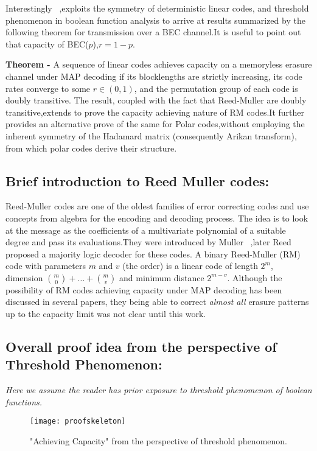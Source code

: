 \documentclass[
10pt, %
a4paper, %
oneside, %
headinclude,footinclude, %
BCOR5mm, %
]{scrartcl}
\begin{document}
Interestingly ~\cite{rm2},exploits the symmetry of deterministic linear codes, and threshold phenomenon in boolean function analysis to arrive at results summarized by the following theorem for transmission over a BEC channel.It is useful to point out that capacity of BEC($p$),$r=1-p$.

\textbf{Theorem - } A sequence of linear codes achieves capacity on
a memoryless erasure channel under MAP decoding if its blocklengths are strictly increasing, its code rates converge to some $r \in (0, 1)$, and the permutation group of each code is doubly transitive. 
The result, coupled with the fact that Reed-Muller are doubly transitive,extends to prove the capacity achieving nature of RM codes.It further provides an alternative prove of the same for Polar codes,without employing the inherent symmetry of the Hadamard matrix (consequently Arikan transform), from which polar codes derive their structure.

\subsection*{Brief introduction to Reed Muller codes:}
Reed-Muller codes are one of the oldest families of error correcting codes and use
concepts from algebra for the encoding and decoding process. The idea is to look
at the message as the coefficients of a multivariate polynomial of a suitable degree and pass 
its evaluations.They were introduced by Muller~\cite{muller} ,later Reed~\cite{reed} proposed a majority logic decoder for these codes. A binary Reed-Muller (RM) code with parameters $m$ and $v$ (the order) is a linear code of length $2^m$, dimension ${m \choose 0}+\ldots+{m \choose v}$ and minimum distance $2^{m-v}$. Although the possibility of RM codes achieving capacity under MAP decoding has been discussed in several papers, they being able to correct \emph{almost all} erasure patterns up to the capacity limit was not clear until this work.

\subsection*{Overall proof idea from the perspective of Threshold Phenomenon:}
\emph{Here we assume the reader has prior exposure to threshold phenomenon of boolean functions.}
\begin{figure}[h]
\centering 
\texttt{[image: proofskeleton]} 
\caption[]{"Achieving Capacity" from the perspective of threshold phenomenon. } %
\label{fig:proofskel} 
\end{figure}
\end{document}
